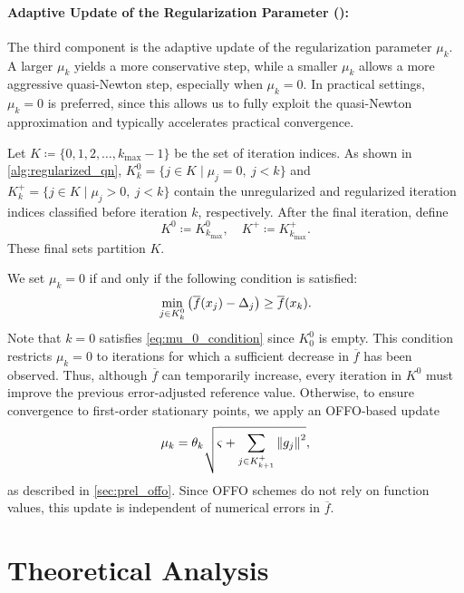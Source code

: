 \documentclass[journal_revised_MPC]{subfiles}
\begin{document}
\paragraph{Adaptive Update of the Regularization Parameter (): }\label{sec:algorithm_components_mu}

The third component is the adaptive update of the regularization parameter $\mu_k$.
A larger $\mu_k$ yields a more conservative step, while a smaller $\mu_k$ allows a more aggressive quasi-Newton step, especially when $\mu_k=0$.
In practical settings, $\mu_k=0$ is preferred, since this allows us to fully exploit the quasi-Newton approximation and typically accelerates practical convergence.
\begin{MPCchange}
Let $K\coloneqq \{0,1,2,\ldots, k_{\max}-1\}$ be the set of iteration indices.
As shown in \cref{alg:regularized_qn}, $K_k^0 = \{j \in K \mid \mu_j = 0,\ j < k\}$ and $K_k^+ = \{j \in K \mid \mu_j > 0,\ j < k\}$ contain the unregularized and regularized iteration indices classified before iteration $k$, respectively.
After the final iteration, define
\begin{equation}\label{eq:def_K0_Kplus}
    K^0 \coloneqq K^0_{k_{\max}}, \quad K^+ \coloneqq K^+_{k_{\max}}.
\end{equation}
These final sets partition $K$.
\end{MPCchange}
We set $\mu_k=0$ if and only if the following condition is satisfied:
\begin{equation}\label{eq:mu_0_condition}
    \min_{j \in K_k^0} \qty(\overline{f}(x_j)- \Delta_j) \ge \overline{f}(x_k).
\end{equation}
Note that $k=0$ satisfies \cref{eq:mu_0_condition} since $K_0^0$ is empty.
This condition restricts $\mu_k=0$ to iterations for which a sufficient decrease in $\overline f$ has been observed.
Thus, although $\overline{f}$ can temporarily increase, every iteration in $K^0$ must improve the previous error-adjusted reference value.
Otherwise, to ensure convergence to first-order stationary points, we apply an OFFO-based update
\begin{equation}\label{eq:offo_based_update}
    \mu_k = \theta_k \sqrt{\varsigma+\sum_{j \in K^+_{k+1}}\norm{g_j}^2},
\end{equation}
as described in \cref{sec:prel_offo}.
Since OFFO schemes do not rely on function values, this update is independent of numerical errors in $\overline{f}$.

\section{Theoretical Analysis}\label{sec:analysis}
\end{document}
